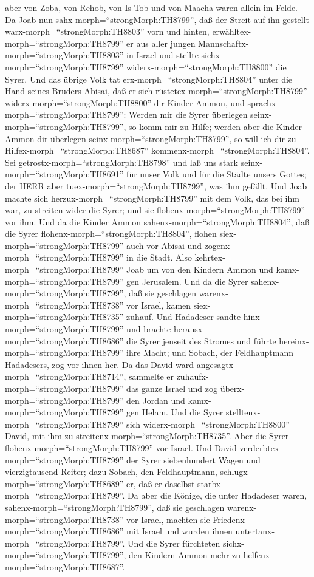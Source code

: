 aber von Zoba, von Rehob, von Is-Tob und von Maacha waren allein im
Felde.  Da Joab nun sahx-morph=``strongMorph:TH8799'', daß
der Streit auf ihn gestellt warx-morph=``strongMorph:TH8803'' vorn und
hinten, erwähltex-morph=``strongMorph:TH8799'' er aus aller jungen
Mannschaftx-morph=``strongMorph:TH8803'' in Israel und stellte
sichx-morph=``strongMorph:TH8799'' widerx-morph=``strongMorph:TH8800''
die Syrer.  Und das übrige Volk tat
erx-morph=``strongMorph:TH8804'' unter die Hand seines Bruders Abisai,
daß er sich rüstetex-morph=``strongMorph:TH8799''
widerx-morph=``strongMorph:TH8800'' dir Kinder Ammon,  und
sprachx-morph=``strongMorph:TH8799'': Werden mir die Syrer überlegen
seinx-morph=``strongMorph:TH8799'', so komm mir zu Hilfe; werden aber
die Kinder Ammon dir überlegen seinx-morph=``strongMorph:TH8799'', so
will ich dir zu Hilfex-morph=``strongMorph:TH8687''
kommenx-morph=``strongMorph:TH8804''.  Sei
getrostx-morph=``strongMorph:TH8798'' und laß uns stark
seinx-morph=``strongMorph:TH8691'' für unser Volk und für die Städte
unsers Gottes; der HERR aber tuex-morph=``strongMorph:TH8799'', was ihm
gefällt.  Und Joab machte sich
herzux-morph=``strongMorph:TH8799'' mit dem Volk, das bei ihm war, zu
streiten wider die Syrer; und sie flohenx-morph=``strongMorph:TH8799''
vor ihm.  Und da die Kinder Ammon
sahenx-morph=``strongMorph:TH8804'', daß die Syrer
flohenx-morph=``strongMorph:TH8804'', flohen
siex-morph=``strongMorph:TH8799'' auch vor Abisai und
zogenx-morph=``strongMorph:TH8799'' in die Stadt. Also
kehrtex-morph=``strongMorph:TH8799'' Joab um von den Kindern Ammon und
kamx-morph=``strongMorph:TH8799'' gen Jerusalem.  Und da
die Syrer sahenx-morph=``strongMorph:TH8799'', daß sie geschlagen
warenx-morph=``strongMorph:TH8738'' vor Israel, kamen
siex-morph=``strongMorph:TH8735'' zuhauf.  Und Hadadeser
sandte hinx-morph=``strongMorph:TH8799'' und brachte
herausx-morph=``strongMorph:TH8686'' die Syrer jenseit des Stromes und
führte hereinx-morph=``strongMorph:TH8799'' ihre Macht; und Sobach, der
Feldhauptmann Hadadesers, zog vor ihnen her.  Da das David
ward angesagtx-morph=``strongMorph:TH8714'', sammelte er
zuhaufx-morph=``strongMorph:TH8799'' das ganze Israel und zog
überx-morph=``strongMorph:TH8799'' den Jordan und
kamx-morph=``strongMorph:TH8799'' gen Helam. Und die Syrer
stelltenx-morph=``strongMorph:TH8799'' sich
widerx-morph=``strongMorph:TH8800'' David, mit ihm zu
streitenx-morph=``strongMorph:TH8735''.  Aber die Syrer
flohenx-morph=``strongMorph:TH8799'' vor Israel. Und David
verderbtex-morph=``strongMorph:TH8799'' der Syrer siebenhundert Wagen
und vierzigtausend Reiter; dazu Sobach, den Feldhauptmann,
schlugx-morph=``strongMorph:TH8689'' er, daß er daselbst
starbx-morph=``strongMorph:TH8799''.  Da aber die Könige,
die unter Hadadeser waren, sahenx-morph=``strongMorph:TH8799'', daß sie
geschlagen warenx-morph=``strongMorph:TH8738'' vor Israel, machten sie
Friedenx-morph=``strongMorph:TH8686'' mit Israel und wurden ihnen
untertanx-morph=``strongMorph:TH8799''. Und die Syrer fürchteten
sichx-morph=``strongMorph:TH8799'', den Kindern Ammon mehr zu
helfenx-morph=``strongMorph:TH8687''.

